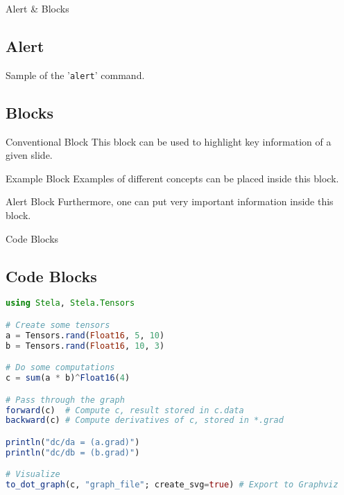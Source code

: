 \documentclass[8pt, handout, aspectratio = 1510]{beamer}
\begin{document}
	\begin{frame}{Alert \& Blocks}
		\subsection{Alert}
		\alert{Sample of the '\texttt{alert}' command.}

		\vspace{5mm}
		\subsection{Blocks}
		\begin{block}{Conventional Block}
			This block can be used to highlight key information of a given slide.
		\end{block}

		\begin{exampleblock}{Example Block}
			Examples of different concepts can be placed inside this block.
		\end{exampleblock}

		\begin{alertblock}{Alert Block}
			Furthermore, one can put very important information inside this block.
		\end{alertblock}
	\end{frame}

	\begin{frame}[fragile]{Code Blocks}
		\subsection{Code Blocks}

		\begin{lstlisting}[language = julia, caption = {Some random code}]
using Stela, Stela.Tensors

# Create some tensors
a = Tensors.rand(Float16, 5, 10)
b = Tensors.rand(Float16, 10, 3)

# Do some computations
c = sum(a * b)^Float16(4)

# Pass through the graph
forward(c)  # Compute c, result stored in c.data
backward(c) # Compute derivatives of c, stored in *.grad

println("dc/da = (a.grad)")
println("dc/db = (b.grad)")

# Visualize
to_dot_graph(c, "graph_file"; create_svg=true) # Export to Graphviz
		\end{lstlisting}

	\end{frame}
\end{document}
